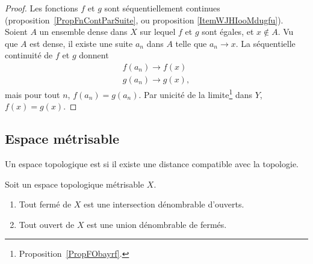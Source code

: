 \begin{proof}
	Les fonctions \( f\) et \( g\) sont séquentiellement continues (proposition~\ref{PropFnContParSuite}, ou proposition \ref{ItemWJHIooMdugfu}). Soient \( A\) un ensemble dense dans \( X\) sur lequel \( f\) et \( g\) sont égales, et \( x\notin A\). Vu que \( A\) est dense, il existe une suite \( a_n\) dans \( A\) telle que \( a_n\to x\). La séquentielle continuité de \( f\) et \( g\) donnent
	\begin{subequations}
		\begin{align}
			f(a_n)\to f(x) \\
			g(a_n)\to g(x),
		\end{align}
	\end{subequations}
	mais pour tout \( n\), \( f(a_n)=g(a_n)\). Par unicité de la limite\footnote{Proposition~\ref{PropFObayrf}.} dans \( Y\), \( f(x)=g(x)\).
\end{proof}

\subsection{Espace métrisable}

\begin{definition}
	Un espace topologique est  si il existe une distance compatible avec la topologie.
\end{definition}

\begin{proposition}      \label{PROPooXWBTooCvGLOj}
	Soit un espace topologique métrisable \( X\).
	\begin{enumerate}
		\item   \label{ITEMooOXVRooBsKwuq}
		      Tout fermé de \( X\) est une intersection dénombrable d'ouverts.
		\item
		      Tout ouvert de \( X\) est une union dénombrable de fermés.
	\end{enumerate}
\end{proposition}

